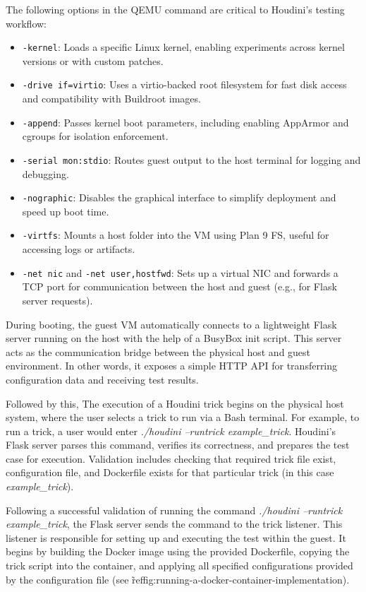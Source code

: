\documentclass[12pt]{report}
\begin{document}
\begin{doublespace}
The following options in the QEMU command are critical to Houdini's testing workflow:

\begin{itemize}
\item \texttt{-kernel}: Loads a specific Linux kernel, enabling experiments across kernel versions or with custom patches.
\item \texttt{-drive if=virtio}: Uses a virtio-backed root filesystem for fast disk access and compatibility with Buildroot images.
\item \texttt{-append}: Passes kernel boot parameters, including enabling AppArmor and cgroups for isolation enforcement.
\item \texttt{-serial mon:stdio}: Routes guest output to the host terminal for logging and debugging.
\item \texttt{-nographic}: Disables the graphical interface to simplify deployment and speed up boot time.
\item \texttt{-virtfs}: Mounts a host folder into the VM using Plan 9 FS, useful for accessing logs or artifacts.
\item \texttt{-net nic} and \texttt{-net user,hostfwd}: Sets up a virtual NIC and forwards a TCP port for communication between the host and guest (e.g., for Flask server requests).
\end{itemize}

During booting, the guest VM automatically connects to a lightweight Flask server running on the host with the help of a BusyBox init script. This server acts as the communication bridge between the physical host and guest environment. In other words, it exposes a simple HTTP API for transferring configuration data and receiving test results.

Followed by this, The execution of a Houdini trick begins on the physical host system, where the user selects a trick to run via a Bash terminal. For example, to run a trick, a user would enter \textit{./houdini --runtrick example\_trick}. Houdini’s Flask server parses this command, verifies its correctness, and prepares the test case for execution. Validation includes checking that required trick file exist, configuration file, and Dockerfile exists for that particular trick (in this case \textit{example\_trick}).

Following a successful validation of running the command \textit{./houdini --runtrick example\_trick}, the Flask server sends the command to the trick listener. This listener is responsible for setting up and executing the test within the guest. It begins by building the Docker image using the provided Dockerfile, copying the trick script into the container, and applying all specified configurations provided by the configuration file (see \~ref{fig:running-a-docker-container-implementation}).


\end{doublespace}
\end{document}
